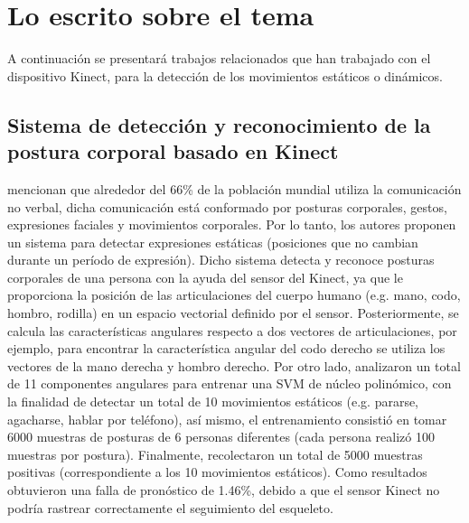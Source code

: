 \newpage 
\section{Lo escrito sobre el tema} \label{tr}
A continuaci\'on se presentar\'a trabajos relacionados que han trabajado con el dispositivo Kinect, para la detecci\'on de los movimientos est\'aticos o din\'amicos.
\subsection{Sistema de detecci\'on y reconocimiento de la postura corporal basado en Kinect} \label{tr:1}
 mencionan que alrededor del 66\% de la poblaci\'on mundial utiliza la comunicaci\'on no verbal, dicha comunicaci\'on est\'a conformado por posturas corporales, gestos, expresiones faciales y movimientos corporales. Por lo tanto, los autores proponen un sistema para detectar expresiones est\'aticas (posiciones que no cambian durante un per\'iodo de expresi\'on).
\medbreak
Dicho sistema detecta y reconoce posturas corporales de una persona con la ayuda del sensor del Kinect, ya que le proporciona la posici\'on de las articulaciones del cuerpo humano (e.g. mano, codo, hombro, rodilla) en un espacio vectorial definido por el sensor. Posteriormente, se calcula las caracter\'isticas angulares respecto a dos vectores de articulaciones, por ejemplo, para encontrar la caracter\'istica angular del codo derecho se utiliza los vectores de la mano derecha y hombro derecho.
\medbreak
Por otro lado,  analizaron un total de 11 componentes angulares para entrenar una \acrfull{SVM} de n\'ucleo polin\'omico, con la finalidad de detectar un total de 10 movimientos est\'aticos (e.g. pararse, agacharse, hablar por tel\'efono), as\'i mismo, el entrenamiento consisti\'o en tomar 6000 muestras de posturas de 6 personas diferentes (cada persona realiz\'o 100 muestras por postura).
\medbreak
Finalmente,  recolectaron un total de 5000 muestras positivas (correspondiente a los 10 movimientos est\'aticos).  Como resultados obtuvieron una falla de pron\'ostico de 1.46\%, debido a que el sensor Kinect no podr\'ia rastrear correctamente el seguimiento del esqueleto.
